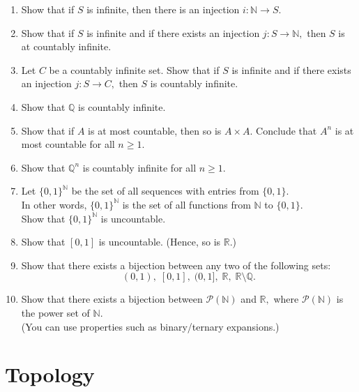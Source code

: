\documentclass[12pt]{article}
\theoremstyle{definition}
\numberwithin{thm}{section}
\begin{document}
\begin{enumerate}
	\item Show that if $S$ is infinite, then there is an injection $i:\mathbb{N} \to S.$
	\item Show that if $S$ is infinite and if there exists an injection $j:S \to \mathbb{N},$ then $S$ is at countably infinite.
	\item Let $C$ be a countably infinite set. Show that if $S$ is infinite and if there exists an injection $j:S \to C,$ then $S$ is countably infinite.
	\item Show that $\mathbb{Q}$ is countably infinite.
	\item Show that if $A$ is at most countable, then so is $A \times A.$ Conclude that $A^n$ is at most countable for all $n \ge 1.$
	\item Show that $\mathbb{Q}^n$ is countably infinite for all $n \ge 1.$
	\item Let $\{0, 1\}^\mathbb{N}$ be the set of all sequences with entries from $\{0, 1\}.$\\
	In other words, $\{0, 1\}^\mathbb{N}$ is the set of all functions from $\mathbb{N}$ to $\{0, 1\}.$\\
	Show that $\{0, 1\}^\mathbb{N}$ is uncountable.
	\item Show that $[0, 1]$ is uncountable. (Hence, so is $\mathbb{R}.$)
	\item Show that there exists a bijection between any two of the following sets: 
	\begin{equation*} 
		(0, 1),\; [0, 1],\; (0, 1],\; \mathbb{R},\; \mathbb{R}\setminus\mathbb{Q}.
	\end{equation*}
	\item Show that there exists a bijection between $\mathcal{P}(\mathbb{N})$ and $\mathbb{R},$ where $\mathcal{P}(\mathbb{N})$ is the power set of $\mathbb{N}.$\\
	(You can use properties such as binary/ternary expansions.)
\end{enumerate}
\newpage\section{Topology}
\end{document}
